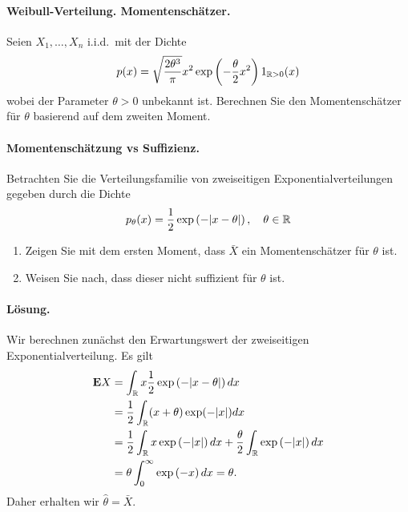 
\paragraph{Weibull-Verteilung. Momentenschätzer.} Seien 
$X_1,\ldots,X_n$ i.i.d.\ mit der Dichte 
\begin{equation*}
	p(x) = \sqrt{ \frac{2 \theta^3}{\pi} } x^2 \exp\left( - \frac{\theta}{2}x^2 \right) 1_{\mathbb R>0}(x)
\end{equation*}
wobei der Parameter $\theta>0$ unbekannt ist. Berechnen Sie den Momentenschätzer für $\theta$
basierend auf dem zweiten Moment. 

\paragraph{Momentenschätzung vs Suffizienz.}   Betrachten 
Sie die Verteilungsfamilie von zweiseitigen Exponentialverteilungen
gegeben durch die Dichte
\begin{equation*}
	p_\theta(x) = \frac{1}{2} \exp\left( -| x- \theta | \right), \quad \theta\in\mathbb R
\end{equation*}
\begin{enumerate}
    \item Zeigen Sie mit dem ersten Moment, dass $\bar X$ ein Momentenschätzer
        für $\theta$ ist.
    \item Weisen Sie nach, dass dieser nicht suffizient für $\theta$ ist.
\end{enumerate}

\paragraph*{Lösung.} Wir berechnen zunächst den Erwartungswert der zweiseitigen
Exponentialverteilung. Es gilt
\begin{align*}
    \mathbf{E} X &= \int_{\mathbb R}^{} x \frac{1}{2} \exp \left( -| x-\theta| \right) dx \\
    &= \frac{1}{2} \int_{\mathbb R}^{} (x+\theta) \exp ( -|x|) dx \\
    &= \frac{1}{2} \int_{\mathbb R} x \exp \left( -|x| \right) dx + 
        \frac{\theta}{2} \int_{\mathbb R} \exp \left( -|x| \right) dx \\
        &= \theta \int_{0}^{\infty} \exp \left( -x \right) dx = \theta.
\end{align*}
Daher erhalten wir $\hat \theta = \bar X$. 

